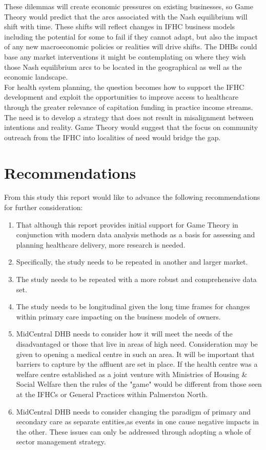 \documentclass[11pt,a4paper]{article}
\begin{document}
These dilemmas will create economic pressures on existing businesses, so Game Theory would predict that the arcs associated with the Nash equilibrium will shift with time. These shifts will reflect changes in IFHC business models including the potential for some to fail if they cannot adapt, but also the impact of any new macroeconomic policies or realities will drive shifts. The DHBs could base any market interventions it might be contemplating on where they wish those Nash equilibrium arcs to be located in the geographical as well as the economic landscape.\\


For health system planning, the question becomes how to support the IFHC development and exploit the opportunities to improve access to healthcare through the greater relevance of capitation funding in practice income streams. The need is to develop a strategy that does not result in misalignment between intentions and reality\citep{kerr1995folly}. Game Theory would suggest that the focus on community  outreach from the IFHC into localities of need would bridge the gap.\\


\section{Recommendations}
 From this study this report would like to advance the following recommendations for further consideration:
 
\begin{enumerate}
\item That although this report provides initial support for Game Theory in conjunction with modern data analysis methods as a basis for assessing and planning healthcare delivery, more research is needed.
\item Specifically, the study needs to be repeated in another and larger market.
\item The study needs to be repeated with a more robust and comprehensive data set.
\item The study needs to be longitudinal given the long time frames for changes within primary care impacting on the business models of owners.
\item MidCentral DHB needs to consider how it will meet the needs of the disadvantaged or those that live in areas of high need. Consideration may be given to opening a medical centre in such an area. It will be important that barriers to capture by the affluent are set in place. If the health centre was a welfare centre established as a joint venture with Ministries of Housing \& Social Welfare then the rules of the "game" would be different from those seen at the IFHCs or General Practices within Palmerston North.
\item MidCentral DHB needs to consider changing the paradigm of primary and secondary care as separate entities,as events in one cause negative impacts in the other. These issues can only be addressed through adopting a whole of sector management strategy. 
\end{enumerate}
\pagebreak
\end{document}
